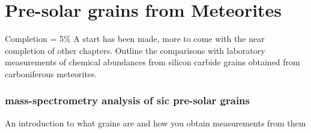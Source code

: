 \chapter{Pre-solar grains from Meteorites}

Completion = 5\%
A start has been made, more to come with the near completion of other chapters.
Outline the comparisons with laboratory measurements of chemical abundances from silicon carbide grains obtained from carboniferous meteorites.

\subsection{mass-spectrometry analysis of \acrfull{sic} pre-solar grains}

An introduction to what grains are and how you obtain measurements from them